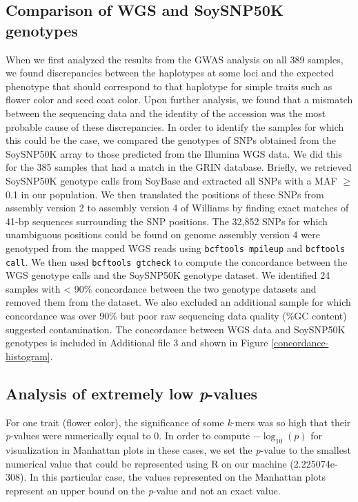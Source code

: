 \documentclass[12pt]{report}
\begin{document}
\subsection*{Comparison of WGS and SoySNP50K genotypes}
\label{annexe-sv-gwas-soysnp50k}
When we first analyzed the results from the GWAS analysis on all 389 samples,
we found discrepancies between the haplotypes at some loci and the expected
phenotype that should correspond to that haplotype for simple traits such as
flower color and seed coat color. Upon further analysis, we found that a
mismatch between the sequencing data and the identity of the accession was the
most probable cause of these discrepancies. In order to identify the samples
for which this could be the case, we compared the genotypes of SNPs obtained
from the SoySNP50K array \citep{song2013} to those predicted from the Illumina WGS
data. We did this for the 385 samples that had a match in the GRIN database. Briefly, we
retrieved SoySNP50K genotype calls from SoyBase \citep{grant2010} and extracted
all SNPs with a MAF $\geq$ 0.1 in our population. We then translated the positions
of these SNPs from assembly version 2 to assembly version 4 of Williams by
finding exact matches of 41-bp sequences surrounding the SNP positions. The
32,852 SNPs for which unambiguous positions could be found on genome assembly
version 4 were genotyped from the mapped WGS reads using \texttt{bcftools
mpileup} and \texttt{bcftools call}. We then used \texttt{bcftools gtcheck} to
compute the concordance between the WGS genotype calls and the
SoySNP50K genotype dataset. We identified 24 samples
with < 90\% concordance between the two genotype datasets and removed them from
the dataset. We also excluded an additional sample for which concordance was over 90\%
but poor raw sequencing data quality (\%GC content) suggested contamination.
The concordance between WGS data and SoySNP50K genotypes is included in
Additional file 3 and shown in Figure \ref{concordance-histogram}.

\subsection*{Analysis of extremely low \textit{p}-values}
\label{annexe-sv-gwas-pvalues}

For one trait (flower color), the significance of some \emph{k}-mers was so
high that their \emph{p}-values were numerically equal to 0. In order to
compute $-\log_{10} (p)$ for visualization in Manhattan plots in these cases,
we set the \emph{p}-value to the smallest numerical value that could be
represented using R on our machine (2.225074e-308). In this particular case,
the values represented on the Manhattan plots represent an upper bound on the
\emph{p}-value and not an exact value.
\end{document}
